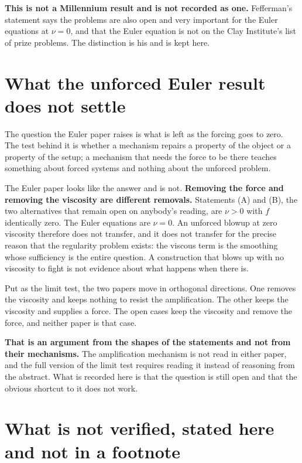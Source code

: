 \textbf{This is not a Millennium result and is not recorded as one.} Fefferman's statement says the
problems are also open and very important for the Euler equations at $\nu = 0$, and that the Euler
equation is not on the Clay Institute's list of prize problems. The distinction is his and is kept
here.

\section{What the unforced Euler result does not settle}

The question the Euler paper raises is what is left as the forcing goes to zero. The test behind it
is whether a mechanism repairs a property of the object or a property of the setup; a mechanism that
needs the force to be there teaches something about forced systems and nothing about the unforced
problem.

The Euler paper looks like the answer and is not. \textbf{Removing the force and removing the
viscosity are different removals.} Statements (A) and (B), the two alternatives that remain open on
anybody's reading, are $\nu > 0$ with $f$ identically zero. The Euler equations are $\nu = 0$. An
unforced blowup at zero viscosity therefore does not transfer, and it does not transfer for the precise
reason that the regularity problem exists: the viscous term is the smoothing whose sufficiency is
the entire question. A construction that blows up with no viscosity to fight is not evidence about
what happens when there is.

Put as the limit test, the two papers move in orthogonal directions. One removes the viscosity and
keeps nothing to resist the amplification. The other keeps the viscosity and supplies a force. The
open cases keep the viscosity and remove the force, and neither paper is that case.

\textbf{That is an argument from the shapes of the statements and not from their mechanisms.} The
amplification mechanism is not read in either paper, and the full version of the limit test
requires reading it instead of reasoning from the abstract. What is recorded here is that the
question is still open and that the obvious shortcut to it does not work.

\section{What is not verified, stated here and not in a footnote}


